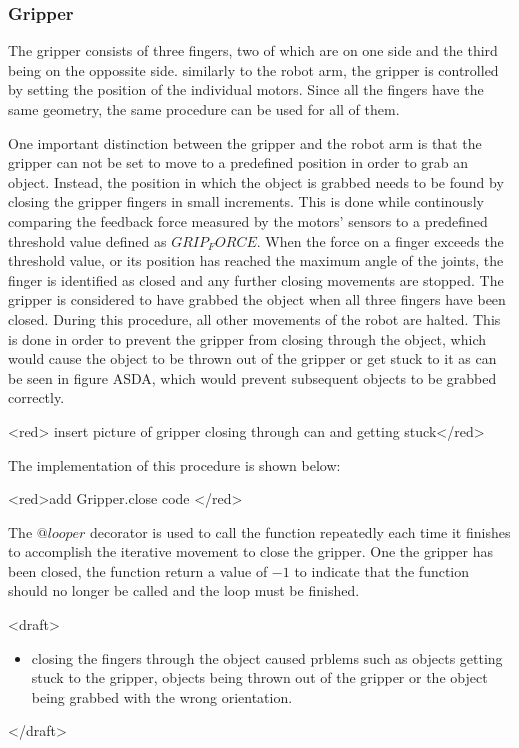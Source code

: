 \subsubsection{Gripper}

The gripper consists of three fingers, two of which are on one side and the third being on the oppossite side. similarly to the robot arm, the gripper is controlled by setting the position of the individual motors. Since all the fingers have the same geometry, the same procedure can be used for all of them. 

One important distinction between the gripper and the robot arm is that the gripper can not be set to move to a predefined position in order to grab an object. Instead, the position in which the object is grabbed needs to be found by closing the gripper fingers in small increments. This is done while continously comparing the feedback force measured by the motors' sensors to a predefined threshold value defined as \(GRIP_FORCE\). When the force on a finger exceeds the threshold value, or its position has reached the maximum angle of the joints, the finger is identified as closed and any further closing movements are stopped. The gripper is considered to have grabbed the object when all three fingers have been closed. During this procedure, all other movements of the robot are halted.
This is done in order to prevent the gripper from closing through the object, which would cause the object to be thrown out of the gripper or get stuck to it as can be seen in figure ASDA, which would prevent subsequent objects to be grabbed correctly.

<red> insert picture of gripper closing through can and getting stuck</red>

The implementation of this procedure is shown below:

<red>add Gripper.close code </red>

The \(@looper\) decorator is used to call the function repeatedly each time it finishes to accomplish the iterative movement to close the gripper. One the gripper has been closed, the function return a value of \(-1\) to indicate that the function should no longer be called and the loop must be finished.


<draft>

\begin{itemize}
    \item closing the fingers through the object caused prblems such as objects getting stuck to the gripper, objects being thrown out of the gripper or the object being grabbed with the wrong orientation.
\end{itemize}  
</draft>

